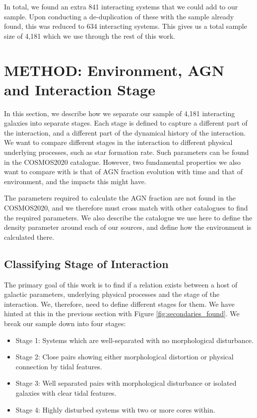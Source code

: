 \documentclass[fleqn,usenatbib]{mnras}
\begin{document}
In total, we found an extra 841 interacting systems that we could add to our sample. Upon conducting a de-duplication of these with the sample already found, this was reduced to 634 interacting systems. This gives us a total sample size of 4,181 which we use through the rest of this work.

\section{METHOD: Environment, AGN and Interaction Stage}
In this section, we describe how we separate our sample of 4,181 interacting galaxies into separate stages. Each stage is defined to capture a different part of the interaction, and a different part of the dynamical history of the interaction. We want to compare different stages in the interaction to different physical underlying processes, such as star formation rate. Such parameters can be found in the COSMOS2020 catalogue. However, two fundamental properties we also want to compare with is that of AGN fraction evolution with time and that of environment, and the impacts this might have.

The parameters required to calculate the AGN fraction are not found in the COSMOS2020, and we therefore must cross match with other catalogues to find the required parameters. We also describe the catalogue we use here to define the density parameter around each of our sources, and define how the environment is calculated there.

\subsection{Classifying Stage of Interaction}\label{sec:staging}
The primary goal of this work is to find if a relation exists between a host of galactic parameters, underlying physical processes and the stage of the interaction. We, therefore, need to define different stages for them. We have hinted at this in the previous section with Figure \ref{fig:secondaries_found}. We break our sample down into four stages:

\begin{itemize}
    \item Stage 1: Systems which are well-separated with no morphological disturbance.
    \item Stage 2: Close pairs showing either morphological distortion or physical connection by tidal features.
    \item Stage 3: Well separated pairs with morphological disturbance or isolated galaxies with clear tidal features.
    \item Stage 4: Highly disturbed systems with two or more cores within.
\end{itemize}
\end{document}
